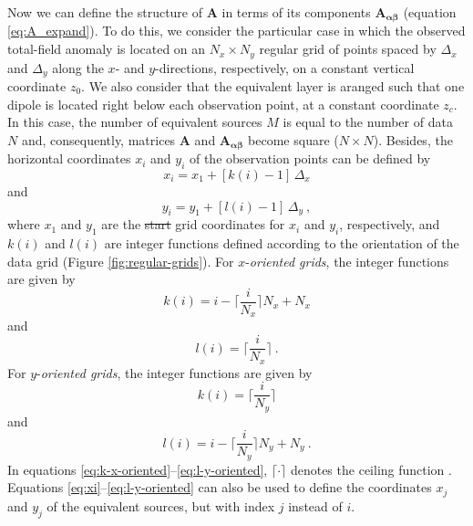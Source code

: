 \documentclass[manuscript]{geophysics}
\providecommand{\DIFaddtex}[1]{{\protect\color{blue}\uwave{#1}}} %
\providecommand{\DIFdeltex}[1]{{\protect\color{red}\sout{#1}}}                      %
\providecommand{\DIFaddbegin}{} %
\providecommand{\DIFaddend}{} %
\providecommand{\DIFdelbegin}{} %
\providecommand{\DIFdelend}{} %
\providecommand{\DIFadd}[1]{\texorpdfstring{\DIFaddtex{#1}}{#1}} %
\providecommand{\DIFdel}[1]{\texorpdfstring{\DIFdeltex{#1}}{}} %
\begin{document}
Now we can define the structure of $\mathbf{A}$ in terms of its components 
$\mathbf{A_{\boldsymbol{\alpha\beta}}}$ (equation \ref{eq:A_expand}). To do this, 
we consider the particular case in which the observed total-field anomaly is located 
on an $N_{x} \times N_{y}$ 
regular grid of points spaced by $\Delta_{x}$ and $\Delta_{y}$ along the $x$- and $y$-directions,
respectively, on a constant vertical coordinate $z_{0}$. We also consider that the equivalent layer
is aranged such that one dipole is located right below each observation point, at a constant coordinate $z_{c}$.
In this case, the number of equivalent sources $M$ is equal to the number of data $N$ and, 
consequently, matrices $\mathbf{A}$ and $\mathbf{A_{\boldsymbol{\alpha\beta}}}$ become 
square ($N \times N$). 
Besides, the horizontal coordinates $x_{i}$ and $y_{i}$ of the observation points 
can be defined by
\begin{equation}
	x_{i} = x_{1} + \left[ k(i) - 1 \right] \, \Delta_{x}
	\label{eq:xi}
\end{equation}
and
\begin{equation}
	y_{i} = y_{1} + \left[ l(i) - 1 \right] \, \Delta_{y} \: ,
	\label{eq:yi}
\end{equation}
where $x_{1}$ and $y_{1}$ are the \DIFdelbegin \DIFdel{start }\DIFdelend \DIFaddbegin \DIFadd{starting }\DIFaddend grid coordinates for $x_{i}$ and $y_{i}$, respectively,
and $k(i)$ and $l(i)$ are integer functions defined according to the orientation
of the data grid (Figure \ref{fig:regular-grids}). 
For $x$-\textit{oriented grids}, the integer functions are given by
\begin{equation}
	k(i)  = i - \Bigg\lceil \frac{i}{N_{x}} \Bigg\rceil N_{x} + N_{x}
	\label{eq:k-x-oriented}
\end{equation}
and
\begin{equation}
	l(i) = \Bigg\lceil \frac{i}{N_{x}} \Bigg\rceil \: .
	\label{eq:l-x-oriented}
\end{equation}
For $y$-\textit{oriented grids}, the integer functions are given by
\begin{equation}
	k(i) = \Bigg\lceil \frac{i}{N_{y}} \Bigg\rceil
	\label{eq:k-y-oriented}
\end{equation}
and
\begin{equation}
	l(i) = i - \Bigg\lceil \frac{i}{N_{y}} \Bigg\rceil N_{y} + N_{y} \: .
	\label{eq:l-y-oriented}
\end{equation}
In equations \ref{eq:k-x-oriented}--\ref{eq:l-y-oriented}, $\lceil \cdot \rceil$ denotes the ceiling 
function \citep[e.g.,][ p. 67-68]{graham-etal1994}.
Equations \ref{eq:xi}--\ref{eq:l-y-oriented} can also be used to define the coordinates 
$x_{j}$ and $y_{j}$ of the equivalent sources, but with index $j$ instead of $i$.
\end{document}
